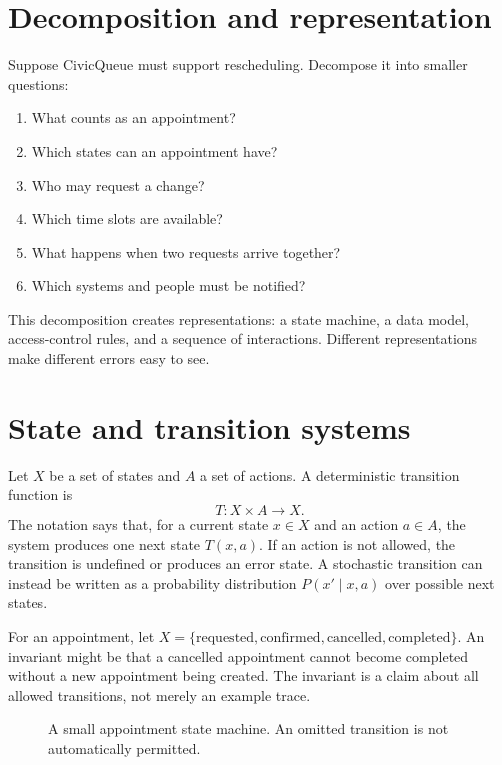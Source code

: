 \section{Decomposition and representation}
Suppose CivicQueue must support rescheduling. Decompose it into smaller questions:
\begin{enumerate}
\item What counts as an appointment?
\item Which states can an appointment have?
\item Who may request a change?
\item Which time slots are available?
\item What happens when two requests arrive together?
\item Which systems and people must be notified?
\end{enumerate}
This decomposition creates representations: a state machine, a data model, access-control rules, and a sequence of interactions. Different representations make different errors easy to see.

\section{State and transition systems}
Let $X$ be a set of states and $A$ a set of actions. A deterministic transition function is
\[
T:X\times A\rightarrow X.
\]
The notation says that, for a current state $x\in X$ and an action $a\in A$, the system produces one next state $T(x,a)$. If an action is not allowed, the transition is undefined or produces an error state. A stochastic transition can instead be written as a probability distribution $P(x'\mid x,a)$ over possible next states.

For an appointment, let $X=\{\text{requested},\text{confirmed},\text{cancelled},\text{completed}\}$. An invariant might be that a cancelled appointment cannot become completed without a new appointment being created. The invariant is a claim about all allowed transitions, not merely an example trace.

\begin{figure}[H]
\centering
{}
\caption{A small appointment state machine. An omitted transition is not automatically permitted.}
\label{fig:appointment-state}
\end{figure}

